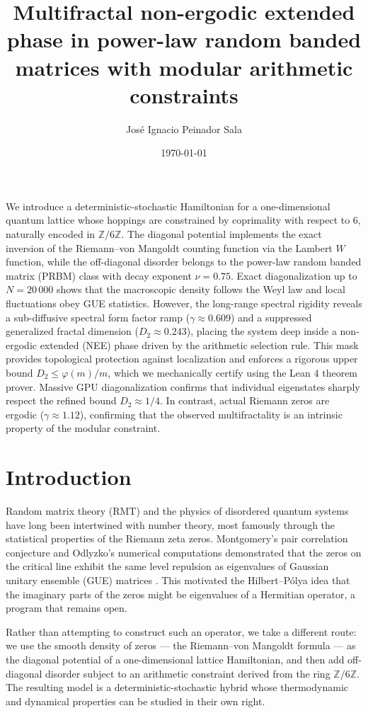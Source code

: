 \documentclass[11pt,a4paper]{article}
\title{Multifractal non-ergodic extended phase in power-law random banded matrices with modular arithmetic constraints}
\author{José Ignacio Peinador Sala \orcidlink{0009-0008-1822-3452}}
\affil{Independent Researcher, Valladolid, Spain}
\affil{\text{Email: }\texttt{joseignacio.peinador@gmail.com}}
\date{\today}
\begin{document}
\maketitle

We introduce a deterministic-stochastic Hamiltonian for a one-dimensional quantum lattice whose hoppings are constrained by coprimality with respect to 6, naturally encoded in $\mathbb{Z}/6\mathbb{Z}$. The diagonal potential implements the exact inversion of the Riemann--von Mangoldt counting function via the Lambert $W$ function, while the off-diagonal disorder belongs to the power-law random banded matrix (PRBM) class with decay exponent $\nu=0.75$. Exact diagonalization up to $N=20\,000$ shows that the macroscopic density follows the Weyl law and local fluctuations obey GUE statistics. However, the long-range spectral rigidity reveals a sub-diffusive spectral form factor ramp ($\gamma \approx 0.609$) and a suppressed generalized fractal dimension ($D_2 \approx 0.243$), placing the system deep inside a non-ergodic extended (NEE) phase driven by the arithmetic selection rule. This mask provides topological protection against localization and enforces a rigorous upper bound $D_2 \le \varphi(m)/m$, which we mechanically certify using the Lean 4 theorem prover. Massive GPU diagonalization confirms that individual eigenstates sharply respect the refined bound $D_2 \approx 1/4$. In contrast, actual Riemann zeros are ergodic ($\gamma \approx 1.12$), confirming that the observed multifractality is an intrinsic property of the modular constraint.

\section{Introduction}

Random matrix theory (RMT) and the physics of disordered quantum systems have long been intertwined with number theory, most famously through the statistical properties of the Riemann zeta zeros. Montgomery's pair correlation conjecture and Odlyzko's numerical computations demonstrated that the zeros on the critical line exhibit the same level repulsion as eigenvalues of Gaussian unitary ensemble (GUE) matrices \cite{Montgomery1973,Odlyzko2001}. This motivated the Hilbert--P\'olya idea that the imaginary parts of the zeros might be eigenvalues of a Hermitian operator, a program that remains open.

Rather than attempting to construct such an operator, we take a different route: we use the smooth density of zeros — the Riemann--von Mangoldt formula — as the diagonal potential of a one-dimensional lattice Hamiltonian, and then add off-diagonal disorder subject to an arithmetic constraint derived from the ring $\mathbb{Z}/6\mathbb{Z}$. The resulting model is a deterministic-stochastic hybrid whose thermodynamic and dynamical properties can be studied in their own right.
\end{document}
